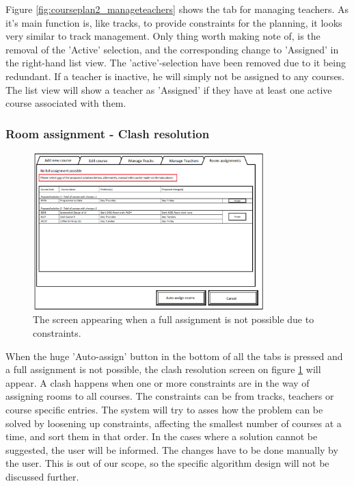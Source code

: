 Figure \ref{fig:courseplan2_manageteachers} shows the tab for managing teachers. As it's main function is, like tracks, to provide constraints for the planning, it looks very similar to track management.
Only thing worth making note of, is the removal of the 'Active' selection, and the corresponding change to 'Assigned' in the right-hand list view. The 'active'-selection have been removed due to it being redundant. If a teacher is inactive, he will simply not be assigned to any courses. The list view will show a teacher as 'Assigned' if they have at least one active course associated with them.

\subsubsection{Room assignment - Clash resolution}
\begin{figure}[htb]
\begin{center}
\leavevmode
\includegraphics[width=0.8\textwidth]{images/courseplan2_Room_Assignments_clash}
\end{center}
\caption{The screen appearing when a full assignment is not possible due to constraints.}
\label{fig:courseplan2_clash}
\end{figure}
When the huge 'Auto-assign' button in the bottom of all the tabs is pressed and a full assignment is not possible, the clash resolution screen on figure \ref{fig:courseplan2_clash} will appear.
A clash happens when one or more constraints are in the way of assigning rooms to all courses. The constraints can be from tracks, teachers or course specific entries.
The system will try to asses how the problem can be solved by loosening up constraints, affecting the smallest number of courses at a time, and sort them in that order. In the cases where a solution cannot be suggested, the user will be informed. The changes have to be done manually by the user. This is out of our scope, so the specific algorithm design will not be discussed further.

